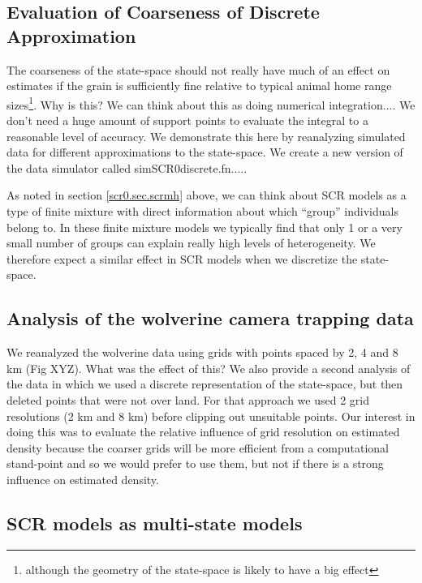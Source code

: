 \subsection{Evaluation of Coarseness of Discrete Approximation}

The coarseness of the state-space should not really have much of an effect on estimates if the grain is sufficiently fine relative to typical animal home range sizes\footnote{ although the geometry of the state-space is likely to have a big effect}. Why is this? We can think about this as doing numerical integration.... We don't need a huge amount of support points to evaluate the integral to a reasonable level of accuracy. We demonstrate this here by reanalyzing simulated data for different approximations to the state-space. We create a new version of the data simulator called simSCR0discrete.fn.....

As noted in section \ref{scr0.sec.scrmh} above, we can think about SCR
models as a type of finite mixture \citep{norris_pollock:1996,
  pledger:2000} with direct information about which ``group'' individuals belong to. In these finite mixture models we typically find that only 1 or a very small number of groups can explain really high levels of heterogeneity. We therefore expect a similar effect in SCR models when we discretize the state-space. 


\subsection{Analysis of the wolverine camera trapping data}

We reanalyzed the wolverine data using grids with points spaced by 2, 4 and 8 km (Fig XYZ). What was the effect of this?
We also provide a second analysis of the data in which we used a discrete representation of the state-space, but then deleted points that were not over land. For that approach we used 2 grid resolutions (2 km and 8 km) before clipping out unsuitable points. Our interest in doing this was to evaluate the relative influence of grid resolution on estimated density because the coarser grids will be more efficient from a computational stand-point and so we would prefer to use them, but not if there is a strong influence on estimated density.  


\subsection{SCR models as multi-state models}

